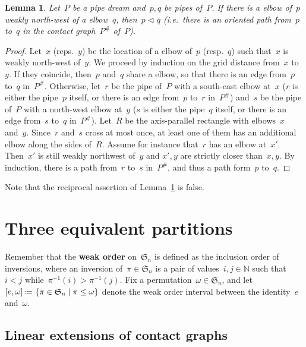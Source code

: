 \documentclass{amsart}
\newtheorem{lemma}[theorem]{Lemma}
\theoremstyle{definition}
\newcommand{\N}{\mathbb{N}} %
\newcommand{\set}[2]{\left\{ #1 \;\middle|\; #2 \right\}} %
\newcommand{\eqdef}{\mbox{\,\raisebox{0.2ex}{\scriptsize\ensuremath{\mathrm:}}\ensuremath{=}\,}} %
\newcommand{\ie}{\textit{i.e.}~} %
\newcommand{\defn}[1]{\textbf{\textsf{\color{PineGreen} #1}}} %
\newcommand{\fS}{\mathfrak{S}} %
\newcommand{\contact}{^\#} %
\newcommand{\less}{\vartriangleleft} %
\newcommand{\contactLess}[1]{\less_{#1}} %
\begin{document}
\begin{lemma}
\label{lem:rectangle}
Let~$P$ be a pipe dream and~$p,q$ be pipes of~$P$. If there is a elbow of~$p$ weakly north-west of a elbow~$q$, then~$p \contactLess{} q$ (\ie there is an oriented path from~$p$ to~$q$ in the contact graph~$P\contact$ of~$P$).
\end{lemma}

\begin{proof}
Let~$x$ (reps.~$y$) be the location of a elbow of~$p$ (resp.~$q$) such that~$x$ is weakly north-west of~$y$. We proceed by induction on the grid distance from~$x$ to~$y$. If they coincide, then~$p$ and~$q$ share a elbow, so that there is an edge from~$p$ to~$q$ in~$P\contact$. Otherwise, let~$r$ be the pipe of~$P$ with a south-east elbow at~$x$ ($r$ is either the pipe~$p$ itself, or there is an edge from~$p$ to~$r$ in~$P\contact$) and~$s$ be the pipe of~$P$ with a north-west elbow at~$y$ ($s$ is either the pipe~$q$ itself, or there is an edge from~$s$ to~$q$ in~$P\contact$). Let~$R$ be the axis-parallel rectangle with elbows~$x$ and~$y$. Since~$r$ and~$s$ cross at most once, at least one of them has an additional elbow along the sides of~$R$. Assume for instance that~$r$ has an elbow at~$x'$. Then~$x'$ is still weakly northwest of~$y$ and $x',y$ are strictly closer than~$x,y$. By induction, there is a path from~$r$ to~$s$ in~$P\contact$, and thus a path form~$p$ to~$q$.
\end{proof}

Note that the reciprocal assertion of Lemma~\ref{lem:rectangle} is false.


\section{Three equivalent partitions}
\label{sec:partitions}

Remember that the \defn{weak order} on~$\fS_n$ is defined as the inclusion order of inversions, where an inversion of~$\pi \in \fS_n$ is a pair of values~$i, j \in \N$ such that~$i < j$ while~$\pi^{-1}(i) > \pi^{-1}(j)$. Fix a permutation~$\omega \in \fS_n$, and let~$[e, \omega] \eqdef \set{\pi \in \fS_n}{\pi \le \omega}$ denote the weak order interval between the identity~$e$ and~$\omega$.


\subsection{Linear extensions of contact graphs}
\label{subsec:linearExtensions}
\end{document}
